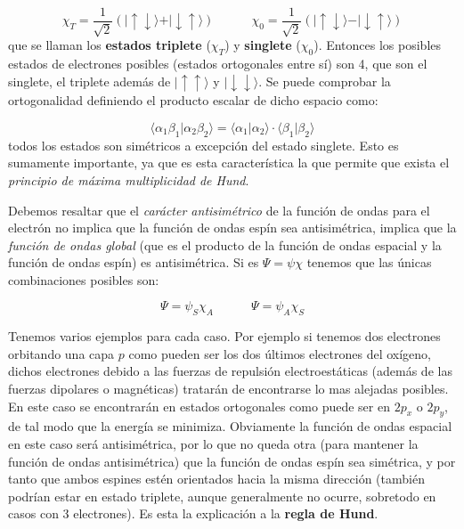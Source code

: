 \documentclass[12pt]{article}
\newcommand{\tquad}{\quad \quad \quad}
\begin{document}
\begin{equation}
\chi_T = \frac{1}{\sqrt{2}} ( \vert \uparrow \downarrow \rangle + \vert \downarrow \uparrow \rangle) \tquad \chi_0 = \frac{1}{\sqrt{2}} ( \vert \uparrow \downarrow \rangle - \vert \downarrow \uparrow \rangle)
\end{equation}
que se llaman los \textbf{estados triplete} ($\chi_T$) y \textbf{singlete} ($\chi_0$). Entonces los posibles estados de electrones posibles (estados ortogonales entre sí) son 4, que son el singlete, el triplete además de $| \uparrow \uparrow \rangle$ y $| \downarrow \downarrow \rangle$. Se puede comprobar la ortogonalidad definiendo el producto escalar de dicho espacio como:

\begin{equation}
  \langle \alpha_1 \beta_1 \vert \alpha_2 \beta_2 \rangle = \langle \alpha_1 \vert \alpha_2 \rangle \cdot \langle \beta_1 \vert \beta_2 \rangle
\end{equation}
todos los estados son simétricos a excepción del estado singlete. Esto es sumamente importante, ya que es esta característica la que permite que exista el \textit{principio de máxima multiplicidad de Hund}. 

Debemos resaltar que el \textit{carácter antisimétrico} de la función de ondas para el electrón no implica que la función de ondas espín sea antisimétrica, implica que la \textit{función de ondas global} (que es el producto de la función de ondas espacial y la función de ondas espín) es antisimétrica. Si es $\Psi=\psi \chi$ tenemos que las únicas combinaciones posibles son:

\begin{equation}
\Psi = \psi_S \chi_A \tquad \Psi = \psi_A \chi_S
\end{equation}

Tenemos varios ejemplos para cada caso. Por ejemplo si tenemos dos electrones orbitando una capa $p$ como pueden ser los dos últimos electrones del oxígeno, dichos electrones debido a las fuerzas de repulsión electroestáticas (además de las fuerzas dipolares o magnéticas) tratarán de encontrarse lo mas alejadas posibles. En este caso se encontrarán en estados ortogonales como puede ser en $2p_x$ o $2p_y$, de tal modo que la energía se minimiza. Obviamente la función de ondas espacial en este caso será antisimétrica, por lo que no queda otra (para mantener la función de ondas antisimétrica) que la función de ondas espín sea simétrica, y por tanto que ambos espines estén orientados hacia la misma dirección (también podrían estar en estado triplete, aunque generalmente no ocurre, sobretodo en casos con 3 electrones). Es esta la explicación a la \textbf{regla de Hund}. \\
\end{document}
